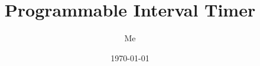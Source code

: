 \documentclass[12pt,a4paper,oneside]{article}
\title{Programmable Interval Timer}
\author{Me}
\date{\today}
\begin{document}
  \sloppy
  \maketitle
  \tableofcontents
  \clearpage

  
\end{document}
